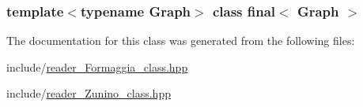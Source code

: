 \subsubsection*{template$<$typename Graph$>$ class final$<$ Graph $>$}



The documentation for this class was generated from the following files:\begin{DoxyCompactItemize}
\item 
include/\hyperlink{reader__Formaggia__class_8hpp}{reader\_\-Formaggia\_\-class.hpp}\item 
include/\hyperlink{reader__Zunino__class_8hpp}{reader\_\-Zunino\_\-class.hpp}\end{DoxyCompactItemize}
